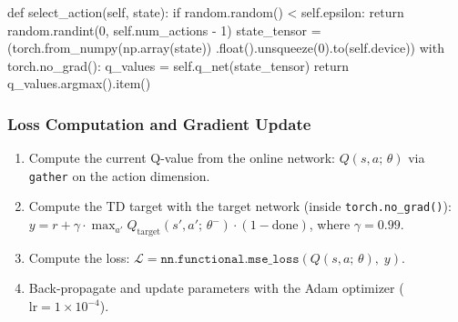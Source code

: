 \documentclass[12pt,a4paper]{report}
\begin{document}
\begin{pycode}
def select_action(self, state):
    if random.random() < self.epsilon:
        return random.randint(0, self.num_actions - 1)
    state_tensor = (torch.from_numpy(np.array(state))
                        .float().unsqueeze(0).to(self.device))
    with torch.no_grad():
        q_values = self.q_net(state_tensor)
    return q_values.argmax().item()
\end{pycode}

\subsubsection*{Loss Computation and Gradient Update}

\begin{enumerate}[leftmargin=2em]
  \item Compute the current Q-value from the online network:
        $Q(s,a;\,\theta)$ via \texttt{gather} on the action dimension.
  \item Compute the TD target with the target network (inside \texttt{torch.no\_grad()}):
        $y = r + \gamma \cdot \max_{a'} Q_{\text{target}}(s',a';\,\theta^-) \cdot (1 - \text{done})$,
        where $\gamma = 0.99$.
  \item Compute the loss:
        $\mathcal{L} = \texttt{nn.functional.mse\_loss}(Q(s,a;\,\theta),\; y)$.
  \item Back-propagate and update parameters with the Adam optimizer
        ($\text{lr} = 1\times 10^{-4}$).
\end{enumerate}
\end{document}
